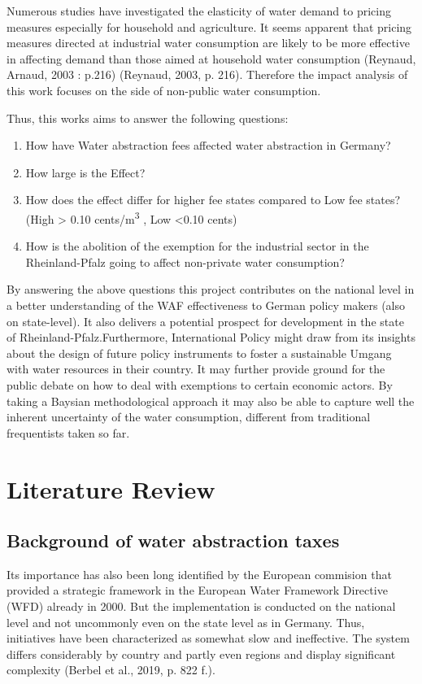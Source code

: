 \documentclass[11pt]{article}
\begin{document}
Numerous studies have investigated the elasticity of water demand to pricing measures especially for household and agriculture. It seems apparent that pricing measures directed at industrial water consumption are likely to be more effective in affecting demand than those aimed at household water consumption (Reynaud, Arnaud, 2003 : p.216) (Reynaud, 2003, p. 216). Therefore the impact analysis of this work focuses on the side of non-public water consumption.

Thus, this works aims to answer the following questions:

\begin{enumerate}
\item How have Water abstraction fees affected water abstraction in Germany?
\item How large is the Effect?
\item How does the effect differ for higher fee states compared to Low fee states? (High > 0.10 cents/m\textsuperscript{3} , Low <0.10 cents)
\item How is the abolition of the exemption for the industrial sector in the Rheinland-Pfalz going to affect non-private water consumption?
\end{enumerate}

By answering the above questions this project contributes on the national level in a better understanding of the WAF effectiveness to German policy makers (also on state-level). It also delivers a potential prospect for development in the state of Rheinland-Pfalz.Furthermore, International Policy might draw from its insights about the design of future policy instruments to foster a sustainable Umgang with water resources in their country. It may further provide ground for the public debate on how to deal with exemptions to certain economic actors. By taking a Baysian methodological approach it may also be able to capture well the inherent uncertainty of the water consumption, different from traditional frequentists taken so far.

\section{Literature Review}
\label{sec:org181bb25}
\label{sec:Literature Review}
\subsection{Background of water abstraction taxes}
\label{sec:org7ea577d}
\label{sec: Background}
Its importance has also been long identified by the European commision that provided a strategic framework in the European Water Framework Directive (WFD) already in 2000. But the implementation is conducted on the national level and not uncommonly even on the state level  as in Germany. Thus, initiatives have been characterized as somewhat slow and ineffective. The system differs considerably by country and partly even regions and display significant complexity (Berbel et al., 2019, p. 822 f.).
\end{document}
